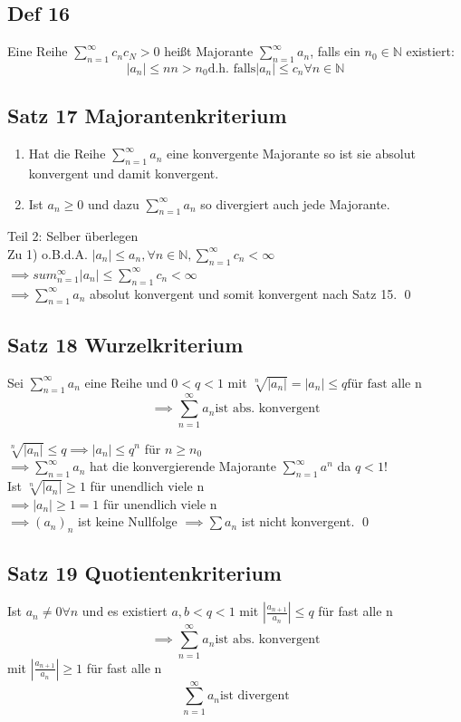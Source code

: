 \documentclass[fleqn]{scrbook}
\newcommand{\N}{\mathbb{N}}
\newcommand{\sumOI}{\sum_{n=1}^{\infty}}
\renewenvironment{proof}{{\bfseries Beweis }}{\qed}
\begin{document}
\subsection{Def 16}
Eine Reihe $ \sumOI c_n c_N > 0$ heißt Majorante $\sumOI a_n$, falls ein $n_0 \in \N$ existiert:
$$|a_n| \le n n>n_0 \text{d.h. falls} |a_n| \le c_n \forall n \in \N$$

\subsection{Satz 17 Majorantenkriterium}
\begin{enumerate}
 \item Hat die Reihe $\sumOI a_n$ eine konvergente Majorante so ist sie absolut konvergent und damit konvergent.
 \item Ist $a_n \ge 0$ und dazu $\sumOI a_n$ so divergiert auch jede Majorante.
\end{enumerate}

\begin{proof}
Teil 2: Selber überlegen\\
Zu 1) o.B.d.A. $|a_n| \leq a_n, \forall n \in\mathbb{N}, \sumOI c_n < \infty$\\
$\implies sum_{n=1}^\infty |a_n| \leq \sumOI c_n < \infty$\\
$\implies \sumOI a_n$ absolut konvergent und somit konvergent nach Satz 15.
\end{proof}


\subsection{Satz 18 Wurzelkriterium}
Sei $\sumOI a_n$ eine Reihe und $0 < q < 1$
mit $\sqrt[n]{|a_n|} = | a_n| \le q \text{für fast alle n}$
$$\implies \sumOI a_n \text{ist abs. konvergent}$$

\begin{proof}
  $\sqrt[n]{|a_n|} \leq q \implies |a_n| \leq q^n$ für $n \geq n_0$\\
  $\implies \sumOI a_n$ hat die konvergierende Majorante $\sumOI a^n$ da $q < 1$!\\
  Ist $\sqrt[n]{|a_n|} \geq 1$ für unendlich viele n\\
  $\implies |a_n| \geq 1 = 1$ für unendlich viele n\\
  $\implies (a_n)_n$ ist keine Nullfolge $\implies \sum a_n$ ist nicht konvergent.
\end{proof}

\subsection{Satz 19 Quotientenkriterium}
Ist $a_n \ne 0 \forall n$ und es existiert $a,b < q < 1$
mit $ | \frac{a_{n+1}}{a_n} | \le q $ für fast alle n
$$\implies \sumOI a_n \text{ist abs. konvergent}$$
mit $ | \frac{a_{n+1}}{a_n} | \ge 1 $ für fast alle n
$$\sumOI a_n \text{ist divergent}$$
\end{document}
